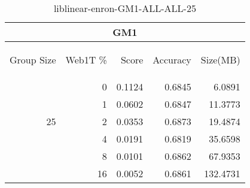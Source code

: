 \begin{center}
\begin{table}[htbp]
\begin{tabular}{ | r | r | r | r | r |}
\hline
\multicolumn{5}{|c|}{GM1}\\
\hline
\begin{sideways}Group Size\end{sideways} & \begin{sideways}Web1T \%\end{sideways} & \begin{sideways}Score\end{sideways} & \begin{sideways}Accuracy\end{sideways} & \begin{sideways}Size(MB)\end{sideways}\\
\hline
\multirow{5}{*}{25}
 & 0 & 0.1124 & 0.6845 & 6.0891\\ \cline{2-5}
 & 1 & 0.0602 & 0.6847 & 11.3773\\ \cline{2-5}
 & 2 & 0.0353 & 0.6873 & 19.4874\\ \cline{2-5}
 & 4 & 0.0191 & 0.6819 & 35.6598\\ \cline{2-5}
 & 8 & 0.0101 & 0.6862 & 67.9353\\ \cline{2-5}
 & 16 & 0.0052 & 0.6861 & 132.4731\\ \cline{2-5}
\hline
\end{tabular}
\caption{liblinear-enron-GM1-ALL-ALL-25}
\label{table:liblinear-enron-GM1-ALL-ALL-25}
\end{table}
\end{center}

